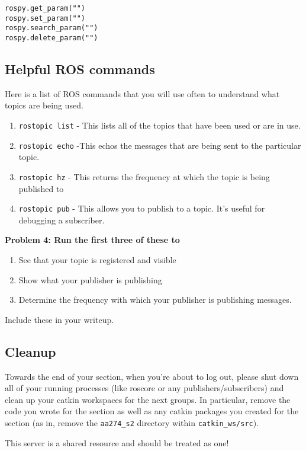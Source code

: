 \begin{lstlisting}
rospy.get_param("")
rospy.set_param("")
rospy.search_param("")
rospy.delete_param("")
\end{lstlisting}

\subsection{Helpful ROS commands}
Here is a list of ROS commands that you will use often to understand what topics are being used.
\begin{enumerate}
	\item \texttt{rostopic list} - This lists all of the topics that have been used or are in use.
	\item \texttt{rostopic echo} -This echos the messages that are being sent to the particular topic.
	\item \texttt{rostopic hz} - This returns the frequency at which the topic is being published to
	\item \texttt{rostopic pub} - This allows you to publish to a topic. It's useful for debugging a subscriber.
\end{enumerate}

{\bf Problem 4: Run the first three of these to
\begin{enumerate}[label=(\alph*)]
    \item See that your topic is registered and visible
    \item Show what your publisher is publishing
    \item Determine the frequency with which your publisher is publishing messages.
\end{enumerate}
Include these in your writeup.}

\subsection{Cleanup}

Towards the end of your section, when you're about to log out, please shut down all of your running processes (like roscore or any publishers/subscribers) and clean up your catkin workspaces for the next groups. In particular, remove the code you wrote for the section as well as any catkin packages you created for the section (as in, remove the \texttt{aa274\_s2} directory within \texttt{catkin\_ws/src}). 

This server is a shared resource and should be treated as one!
